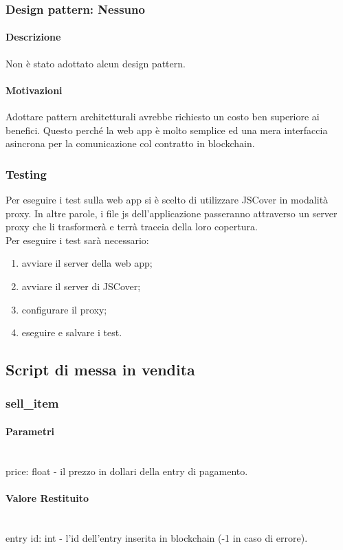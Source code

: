 \documentclass[a4paper, 12pt]{article}
\begin{document}
\subsubsection{Design pattern: Nessuno}
\paragraph{Descrizione}
Non è stato adottato alcun design pattern.
\paragraph{Motivazioni}
Adottare pattern architetturali avrebbe richiesto un costo ben superiore ai benefici. Questo perché la web app è molto semplice ed una mera interfaccia asincrona per la comunicazione col contratto in blockchain.
\subsubsection{Testing}
Per eseguire i test sulla web app si è scelto di utilizzare JSCover in modalità proxy.
In altre parole, i file js dell'applicazione passeranno attraverso un server proxy che li trasformerà e terrà traccia della loro copertura. \\
Per eseguire i test sarà necessario:
\begin{enumerate}
    \item avviare il server della web app;
    \item avviare il server di JSCover;
    \item configurare il proxy;
    \item eseguire e salvare i test.
\end{enumerate}

\subsection{Script di messa in vendita}
\subsubsection{sell\_item}
\paragraph{Parametri}\\
price: float - il prezzo in dollari della entry di pagamento.
\paragraph{Valore Restituito}\\
entry id: int - l'id dell'entry inserita in blockchain (-1 in caso di errore).
\end{document}
